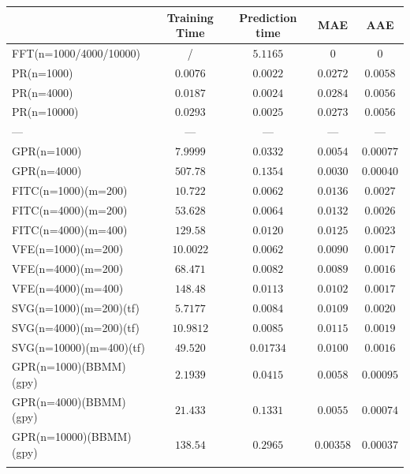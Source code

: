 \documentclass[12pt,a4paper,oneside]{book}
\begin{document}
\begin{table}\centering 
\begin{tabular}[t]{lcccc}\toprule
            &   Training Time  &  Prediction time  &  MAE & AAE   \\ \midrule
FFT(n=1000/4000/10000)    &/ & $5.1165$ &  $0$  &  $0$    \\\addlinespace
PR(n=1000)   & $0.0076$ & $0.0022$    & $0.0272$ &  $0.0058$     \\\addlinespace
PR(n=4000)   &  $0.0187$  & $0.0024$ & $0.0284$ &  $0.0056$   \\\addlinespace
PR(n=10000)	  &   $0.0293$ & $0.0025$ & $0.0273$ & $0.0056$     \\\addlinespace
\qquad \qquad \qquad \qquad \qquad ---	  &   --- & --- & --- & ---     \\\addlinespace
GPR(n=1000)   &  $7.9999$  & $0.0332$ & $0.0054$ &  $0.00077$   \\\addlinespace
GPR(n=4000)   &  $507.78$  & $0.1354$  & $0.0030$ & $0.00040$    \\\addlinespace
FITC(n=1000)(m=200)  & $10.722$ & $\bm{0.0062}$   & $0.0136$ &  $0.0027$     \\\addlinespace
FITC(n=4000)(m=200)   & $53.628$   & $0.0064$ & $0.0132$ &  $0.0026$   \\\addlinespace
FITC(n=4000)(m=400)	 & $129.58$   & $0.0120$ & $0.0125$ & $0.0023$    \\\addlinespace
VFE(n=1000)(m=200)  & $10.0022$ & $0.0062$   & $0.0090$ & $0.0017$  \\\addlinespace
VFE(n=4000)(m=200)   & $68.471$ &  $0.0082$   & $0.0089$ & $0.0016$     \\\addlinespace
VFE(n=4000)(m=400)	 & $148.48$ &  $0.0113$   & $0.0102$ & $0.0017$    \\\addlinespace
SVG(n=1000)(m=200)(tf)  & $5.7177$    & $0.0084$ &$0.0109$  &  $0.0020$   \\\addlinespace
SVG(n=4000)(m=200)(tf)  & $10.9812$   & $0.0085$ & $0.0115$ & $0.0019$    \\\addlinespace
SVG(n=10000)(m=400)(tf)	  & $49.520$   & $0.01734$  & $0.0100$ &  $0.0016$   \\\addlinespace
GPR(n=1000)(BBMM)(gpy)  & $\bm{2.1939} $  & $0.0415$ & $0.0058$ & $0.00095$    \\\addlinespace
GPR(n=4000)(BBMM)(gpy)  & $21.433$   & $0.1331$ & $0.0055$ & $0.00074$    \\\addlinespace
GPR(n=10000)(BBMM)(gpy)  & $138.54$   & $0.2965$  & $0.00358$ &     $0.00037$ \\\addlinespace

\end{tabular}
\end{table}
\end{document}
